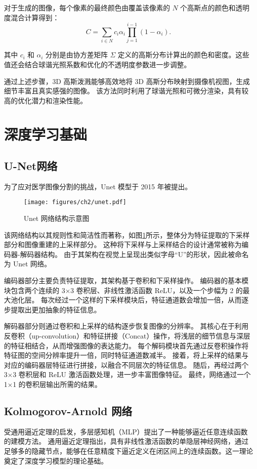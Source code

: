 对于生成的图像，每个像素的最终颜色由覆盖该像素的 $N$ 个高斯点的颜色和透明度混合计算得到：
\begin{equation}
\label{formula: splatting&volume rendering}
    C = \sum_{i\in N}c_i \alpha_i \prod_{j=1}^{i-1} (1-\alpha_i).
\end{equation}

其中 $c_i$ 和 $\alpha_i$ 分别是由协方差矩阵 $\Sigma$ 定义的高斯分布计算出的颜色和密度。这些值还会结合球谐光照系数和优化的不透明度参数进一步调整。

通过上述步骤，3D 高斯泼溅能够高效地将 3D 高斯分布映射到摄像机视图，生成细节丰富且真实感强的图像。
该方法同时利用了球谐光照和可微分渲染，具有较高的优化潜力和渲染性能。

\section{深度学习基础}
\subsection{U-Net网络}
为了应对医学图像分割的挑战，Unet 模型\cite{unet}于 2015 年被提出。
\begin{figure}
    \centering
    \texttt{[image: figures/ch2/unet.pdf]}
    \caption{Unet 网络结构示意图}
    \label{img:unet}
\end{figure}

该网络结构以其规则性和简洁性而著称，如图\ref{img:unet}所示，整体分为特征提取的下采样部分和图像重建的上采样部分。
这种将下采样与上采样结合的设计通常被称为编码器-解码器结构。
由于其架构在视觉上呈现出类似字母“U”的形状，因此被命名为 Unet 网络。

编码器部分主要负责特征提取，其架构基于卷积和下采样操作。
编码器的基本模块包含两个连续的 3×3 卷积层、非线性激活函数 ReLU，以及一个步幅为 2 的最大池化层。
每次经过一个这样的下采样模块后，特征通道数会增加一倍，从而逐步提取出更加抽象的特征信息。

解码器部分则通过卷积和上采样的结构逐步恢复图像的分辨率。
其核心在于利用反卷积（up-convolution）和特征拼接（Concat）操作，将浅层的细节信息与深层的特征相结合，从而增强图像的表达能力。
每个解码模块首先通过反卷积操作将特征图的空间分辨率提升一倍，同时特征通道数减半。
接着，将上采样的结果与对应的编码器层特征进行拼接，以融合不同层次的特征信息。
随后，再经过两个 3×3 卷积层和 ReLU 激活函数处理，进一步丰富图像特征。
最终，网络通过一个 1×1 的卷积层输出所需的结果。




\subsection{Kolmogorov-Arnold 网络}
受通用逼近定理\cite{universal_approximation}的启发，多层感知机（MLP）\cite{mlp}提出了一种能够逼近任意连续函数的建模方法。
通用逼近定理指出，具有非线性激活函数的单隐层神经网络，通过足够多的隐藏节点，能够在任意精度下逼近定义在闭区间上的连续函数。这一理论奠定了深度学习模型的理论基础。

